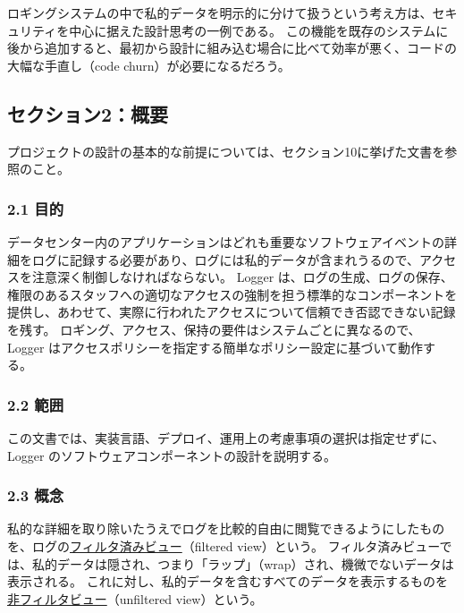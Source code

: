 \documentclass[uplatex]{jsarticle}
\def\label#1{}%
\begin{document}
\begin{rem}[セキュリティ中心の設計思考]\label{rem:appa-security-centric}
ロギングシステムの中で私的データを明示的に分けて扱うという考え方は、セキュリティを中心に据えた設計思考の一例である。
この機能を既存のシステムに後から追加すると、最初から設計に組み込む場合に比べて効率が悪く、コードの大幅な手直し（code churn）が必要になるだろう。
\end{rem}

\subsection{セクション2：概要}

プロジェクトの設計の基本的な前提については、セクション10に挙げた文書を参照のこと。

\subsubsection{2.1 目的}

データセンター内のアプリケーションはどれも重要なソフトウェアイベントの詳細をログに記録する必要があり、ログには私的データが含まれうるので、アクセスを注意深く制御しなければならない。
Logger は、ログの生成、ログの保存、権限のあるスタッフへの適切なアクセスの強制を担う標準的なコンポーネントを提供し、あわせて、実際に行われたアクセスについて信頼でき否認できない記録を残す。
ロギング、アクセス、保持の要件はシステムごとに異なるので、Logger はアクセスポリシーを指定する簡単なポリシー設定に基づいて動作する。

\subsubsection{2.2 範囲}

この文書では、実装言語、デプロイ、運用上の考慮事項の選択は指定せずに、Logger のソフトウェアコンポーネントの設計を説明する。

\subsubsection{2.3 概念}

\begin{dfn}[ログのフィルタ済みビュー]\label{dfn:appa-filtered-view}
私的な詳細を取り除いたうえでログを比較的自由に閲覧できるようにしたものを、ログの\underline{フィルタ済みビュー}（filtered view）という。
フィルタ済みビューでは、私的データは隠され、つまり「ラップ」（wrap）され、機微でないデータは表示される。
これに対し、私的データを含むすべてのデータを表示するものを\underline{非フィルタビュー}（unfiltered view）という。
\end{dfn}
\end{document}
